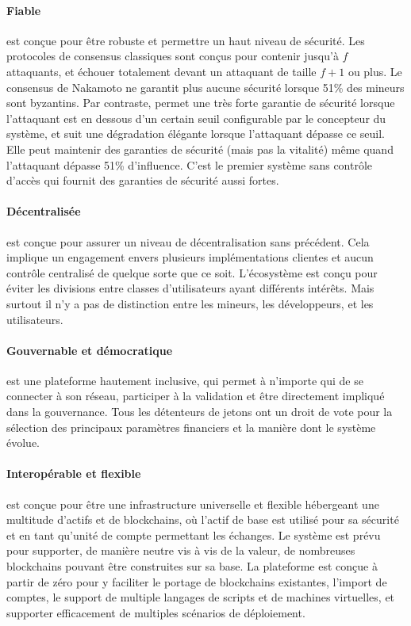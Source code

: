 \documentclass[runningheads,francais,a4paper]{llncs}
\begin{document}
\paragraph{Fiable} \AVAPlatformName{} est conçue pour être robuste et permettre un haut niveau de sécurité. Les
protocoles de consensus classiques sont conçus pour contenir jusqu'à $f$ attaquants, et échouer totalement devant
un attaquant de taille $f+1$ ou plus. Le consensus de Nakamoto ne garantit plus aucune sécurité lorsque 51\% des
mineurs sont byzantins. Par contraste, \AVAPlatformName{} permet une très forte garantie de sécurité lorsque l'attaquant
est en dessous d'un certain seuil configurable par le concepteur du système, et suit une dégradation élégante lorsque
l'attaquant dépasse ce seuil. Elle peut maintenir des garanties de sécurité (mais pas la vitalité) même quand
l'attaquant dépasse 51\% d'influence. C'est le premier système sans contrôle d'accès qui fournit des garanties de
sécurité aussi fortes.

\paragraph{Décentralisée} \AVAPlatformName{} est conçue pour assurer un niveau de décentralisation sans précédent. Cela
implique un engagement envers plusieurs implémentations clientes et aucun contrôle centralisé de quelque sorte que ce soit.
L'écosystème est conçu pour éviter les divisions entre classes d'utilisateurs ayant différents intérêts. Mais surtout
il n'y a pas de distinction entre les mineurs, les développeurs, et les utilisateurs.

\paragraph{Gouvernable et démocratique} \AVAPlatformName{} est une plateforme hautement inclusive, qui permet à
n'importe qui de se connecter à son réseau, participer à la validation et être directement impliqué dans la
gouvernance. Tous les détenteurs de jetons ont un droit de vote pour la sélection des principaux paramètres financiers
et la manière dont le système évolue.

\paragraph{Interopérable et flexible} \AVAPlatformName{} est conçue pour être une infrastructure universelle et flexible
hébergeant une multitude d'actifs et de blockchains, où l'actif de base \AVATokenName{} est utilisé pour sa sécurité
et en tant qu'unité de compte permettant les échanges. Le système est prévu pour supporter, de manière neutre vis à vis
de la valeur, de nombreuses blockchains pouvant être construites sur sa base. La plateforme est conçue à partir de zéro
pour y faciliter le portage de blockchains existantes, l'import de comptes, le support de multiple langages de scripts
et de machines virtuelles, et supporter efficacement de multiples scénarios de déploiement.
\end{document}
